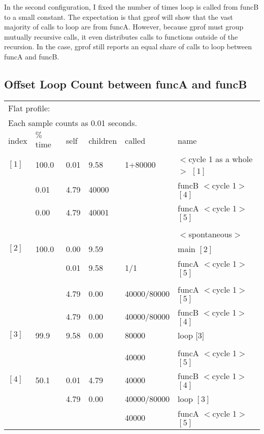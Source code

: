 \documentclass[11pt]{article}
\begin{document}
In the second configuration, I fixed the number of times loop is called from funcB to a small constant.  The expectation is that gprof will show that the vast majority of calls to loop are from funcA. However, because gprof must group mutually recursive calls, it even distributes calls to functions outside of the recursion. In the case, gprof still reports an equal share of calls to loop between funcA and funcB.
\subsection*{Offset Loop Count between funcA and funcB}
\begin{table}[H]
\begin{tabular}{l l  l l l l}
\multicolumn{6}{l}{Flat profile:}\\
\multicolumn{6}{l}{Each sample counts as 0.01 seconds.}\\
index & $\%$ time   & self  &children    &called   & name\\
$[1] $  & 100.0  &  0.01  &  9.58   &    1+80000  & $<$cycle 1 as a whole$>$ $[1]$\\
             &  0.01   & 4.79  & 40000   &     &     funcB $<$cycle 1$>$ $[4]$\\
             &   0.00   &4.79  & 40001   &    &      funcA $<$cycle 1$>$ $[5]$\\
\hline \\
      &&&&&                                           $<$spontaneous$>$\\
$[2]$ &   100.0 &  0.00&   9.59      &&           main $[2]$\\
            &  &  0.01  &  9.58   &    1/1     &      funcA $<$cycle 1$>$ $[5]$\\
\hline \\
             &&   4.79  &  0.00 &  40000/80000    &   funcA $<$cycle 1$>$ $[5]$\\
            &&   4.79 &  0.00  & 40000/80000   &    funcB $<$cycle 1$>$ $[4]$\\
$[3]$   &  99.9  &  9.58  &  0.00  & 80000    &     loop $[$3$]$\\
\hline \\
                      &&&&         40000       &         funcA $<$cycle 1$>$ $[5]$\\
$[4]$ &    50.1 &   0.01 &   4.79  & 40000   &      funcB $<$cycle 1$>$ $[4]$ \\
      &&          4.79  &  0.00  & 40000/80000     &  loop $[3]$\\
                     &&&&          40000       &      funcA $<$cycle 1$>$ $[5]$\\

\end{tabular}
\end{table}
\end{document}
